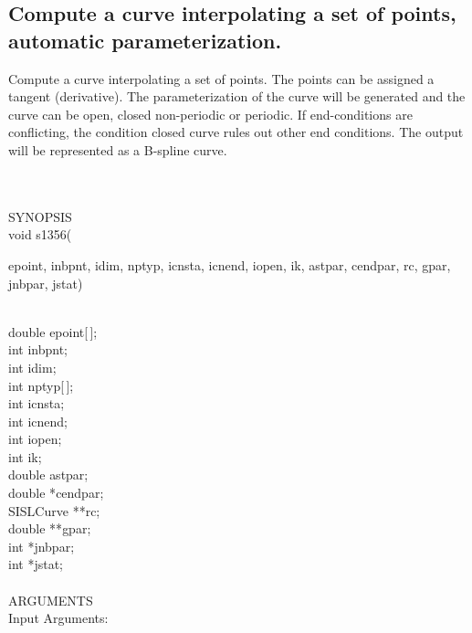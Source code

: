 \subsection{Compute a curve interpolating a set of points,
\mbox{automatic} parameterization.}
\begin{minipg1}
Compute a curve interpolating a set of points.  The points
can be assigned a tangent (derivative).  The parameterization of the
curve will be generated and the curve can be open, closed non-periodic
or periodic.  If end-conditions are conflicting, the condition closed
curve rules out other end conditions.
The output will be represented as a B-spline curve.
\end{minipg1} \\ \\
SYNOPSIS\\
        \>void s1356(\begin{minipg3}
          {\fov epoint}, {\fov inbpnt}, {\fov idim}, {\fov nptyp}, {\fov icnsta}, {\fov icnend}, {\fov iopen}, {\fov ik}, {\fov astpar},
          {\fov cendpar}, {\fov rc}, {\fov gpar}, {\fov jnbpar}, {\fov jstat})
        \end{minipg3}\\[0.3ex]
        \>\>    double \>  {\fov epoint}[\,];\\
        \>\>    int    \>  {\fov inbpnt};\\
        \>\>    int    \>  {\fov idim};\\
        \>\>    int    \>  {\fov nptyp}[\,];\\
        \>\>    int    \>  {\fov icnsta};\\
        \>\>    int    \>  {\fov icnend};\\
        \>\>    int    \>  {\fov iopen};\\
        \>\>    int    \>  {\fov ik};\\
        \>\>    double \>  {\fov astpar};\\
        \>\>    double \>  *{\fov cendpar};\\
        \>\>    SISLCurve \> **{\fov rc};\\
        \>\>    double \>  **{\fov gpar};\\
        \>\>    int    \>  *{\fov jnbpar};\\
        \>\>    int    \>  *{\fov jstat};\\
\\
ARGUMENTS\\
        \>Input Arguments:\\
